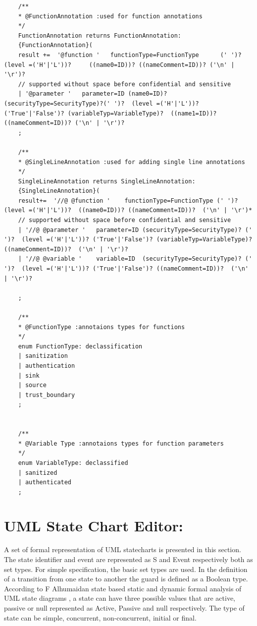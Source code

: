\begin{lstlisting}
	/**
	* @FunctionAnnotation :used for function annotations
	*/ 
	FunctionAnnotation returns FunctionAnnotation:
	{FunctionAnnotation}( 
	result +=  '@function '   functionType=FunctionType      (' ')?                              (level =('H'|'L'))?     ((name0=ID))? ((nameComment=ID))? ('\n' | '\r')?
	// supported without space before confidential and sensitive
	| '@parameter '   parameter=ID (name0=ID)? (securityType=SecurityType)?(' ')?  (level =('H'|'L'))? ('True'|'False')? (variableTyp=VariableType)?  ((name1=ID))? ((nameComment=ID))? ('\n' | '\r')?	
	;
	
	/**
	* @SingleLineAnnotation :used for adding single line annotations
	*/ 
	SingleLineAnnotation returns SingleLineAnnotation:
	{SingleLineAnnotation}(
	result+=  '//@ @function '    functionType=FunctionType (' ')?                  (level =('H'|'L'))?  ((name0=ID))? ((nameComment=ID))?  ('\n' | '\r')*
	// supported without space before confidential and sensitive
	| '//@ @parameter '   parameter=ID (securityType=SecurityType)? (' ')?  (level =('H'|'L'))? ('True'|'False')? (variableTyp=VariableType)?  ((nameComment=ID))?  ('\n' | '\r')?
	| '//@ @variable '    variable=ID  (securityType=SecurityType)? (' ')?  (level =('H'|'L'))? ('True'|'False')? ((nameComment=ID))?  ('\n' | '\r')?
	
	;
	
	/**
	* @FunctionType :annotaions types for functions
	*/ 
	enum FunctionType: declassification 
	| sanitization
	| authentication
	| sink
	| source
	| trust_boundary
	;
	
	
	/**
	* @Variable Type :annotaions types for function parameters
	*/ 
	enum VariableType: declassified 
	| sanitized
	| authenticated
	;	
\end{lstlisting}

\section{UML State Chart Editor:}

A set of formal representation of UML statecharts is presented in this section. The state identifier and event are represented as S and Event respectively both as set types. For simple specification, the basic set types are used. In the definition of a transition from one state to another the guard is defined as a Boolean type. According to F Alhumaidan state based static and dynamic formal analysis of UML state diagrams \cite{ref_16_alhumaidan2012state} , a state can have three possible values that are active, passive or null represented as Active, Passive and null respectively. The type of state can be simple, concurrent, non-concurrent, initial or final.

